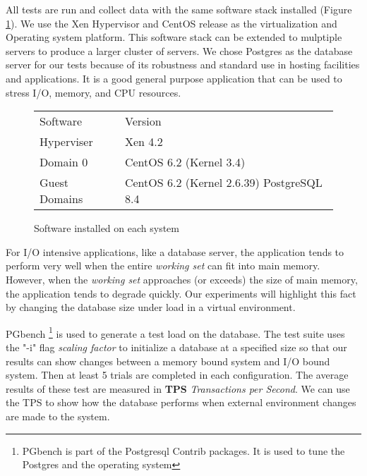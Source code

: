 \indent All tests are run and collect data with the same software stack installed (Figure \ref{fig:softStack}).  We use the Xen Hypervisor and CentOS release as the virtualization and Operating system platform.  This software stack can be extended to mulptiple servers to produce a larger cluster of servers.  We chose Postgres as the database server for our tests because of its robustness and standard use in hosting facilities and applications.  It is a good general purpose application that can be used to stress I/O, memory, and CPU resources. \\

\begin{figure}[h!]
\begin{tabular}{ l p{5cm} }
  Software & Version \\
  Hyperviser & Xen 4.2 \\
  Domain 0 & CentOS 6.2 (Kernel 3.4) \\
  Guest Domains & CentOS 6.2 (Kernel 2.6.39) PostgreSQL 8.4 \\
\end{tabular}
\caption{Software installed on each system}
\label{fig:softStack}
\end{figure}

For I/O intensive applications, like a database server, the application tends to perform very well when the entire \emph{working set} can fit into main memory.  However, when the \emph{working set}  approaches (or exceeds) the size of main memory, the application tends to degrade quickly.  Our experiments will highlight this fact by changing the database size under load in a virtual environment.
\

PGbench \footnote{PGbench is part of the Postgresql Contrib packages.  It is used to tune the Postgres and the operating system} is used to generate a test load on the database.  The test suite uses the "-i" flag \emph{scaling factor} to initialize a database at a specified size so that our results can show changes between a memory bound system and I/O bound system.  Then at least 5 trials are completed in each configuration.  The average results of these test are measured in \textbf{TPS} \emph{Transactions per Second}.   We can use the TPS to show how the database performs when external environment changes are made to the system.
\newline


